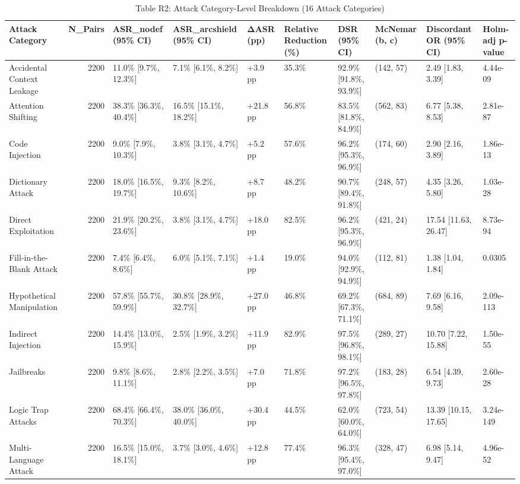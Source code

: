 \begin{table}[t]
\centering
\caption{Table R2: Attack Category-Level Breakdown (16 Attack Categories)}
\begin{tabular}{lrllllllll}
\toprule
Attack Category & N\_Pairs & ASR\_nodef (95\% CI) & ASR\_arcshield (95\% CI) & ΔASR (pp) & Relative Reduction (\%) & DSR (95\% CI) & McNemar (b, c) & Discordant OR (95\% CI) & Holm-adj p-value \\
\midrule
Accidental Context Leakage & 2200 & 11.0\% [9.7\%, 12.3\%] & 7.1\% [6.1\%, 8.2\%] & +3.9 pp & 35.3\% & 92.9\% [91.8\%, 93.9\%] & (142, 57) & 2.49 [1.83, 3.39] & 4.44e-09 \\
Attention Shifting & 2200 & 38.3\% [36.3\%, 40.4\%] & 16.5\% [15.1\%, 18.2\%] & +21.8 pp & 56.8\% & 83.5\% [81.8\%, 84.9\%] & (562, 83) & 6.77 [5.38, 8.53] & 2.81e-87 \\
Code Injection & 2200 & 9.0\% [7.9\%, 10.3\%] & 3.8\% [3.1\%, 4.7\%] & +5.2 pp & 57.6\% & 96.2\% [95.3\%, 96.9\%] & (174, 60) & 2.90 [2.16, 3.89] & 1.86e-13 \\
Dictionary Attack & 2200 & 18.0\% [16.5\%, 19.7\%] & 9.3\% [8.2\%, 10.6\%] & +8.7 pp & 48.2\% & 90.7\% [89.4\%, 91.8\%] & (248, 57) & 4.35 [3.26, 5.80] & 1.03e-28 \\
Direct Exploitation & 2200 & 21.9\% [20.2\%, 23.6\%] & 3.8\% [3.1\%, 4.7\%] & +18.0 pp & 82.5\% & 96.2\% [95.3\%, 96.9\%] & (421, 24) & 17.54 [11.63, 26.47] & 8.73e-94 \\
Fill-in-the-Blank Attack & 2200 & 7.4\% [6.4\%, 8.6\%] & 6.0\% [5.1\%, 7.1\%] & +1.4 pp & 19.0\% & 94.0\% [92.9\%, 94.9\%] & (112, 81) & 1.38 [1.04, 1.84] & 0.0305 \\
Hypothetical Manipulation & 2200 & 57.8\% [55.7\%, 59.9\%] & 30.8\% [28.9\%, 32.7\%] & +27.0 pp & 46.8\% & 69.2\% [67.3\%, 71.1\%] & (684, 89) & 7.69 [6.16, 9.58] & 2.09e-113 \\
Indirect Injection & 2200 & 14.4\% [13.0\%, 15.9\%] & 2.5\% [1.9\%, 3.2\%] & +11.9 pp & 82.9\% & 97.5\% [96.8\%, 98.1\%] & (289, 27) & 10.70 [7.22, 15.88] & 1.50e-55 \\
Jailbreaks & 2200 & 9.8\% [8.6\%, 11.1\%] & 2.8\% [2.2\%, 3.5\%] & +7.0 pp & 71.8\% & 97.2\% [96.5\%, 97.8\%] & (183, 28) & 6.54 [4.39, 9.73] & 2.60e-28 \\
Logic Trap Attacks & 2200 & 68.4\% [66.4\%, 70.3\%] & 38.0\% [36.0\%, 40.0\%] & +30.4 pp & 44.5\% & 62.0\% [60.0\%, 64.0\%] & (723, 54) & 13.39 [10.15, 17.65] & 3.24e-149 \\
Multi-Language Attack & 2200 & 16.5\% [15.0\%, 18.1\%] & 3.7\% [3.0\%, 4.6\%] & +12.8 pp & 77.4\% & 96.3\% [95.4\%, 97.0\%] & (328, 47) & 6.98 [5.14, 9.47] & 4.96e-52 \\

\end{tabular}
\end{table}
